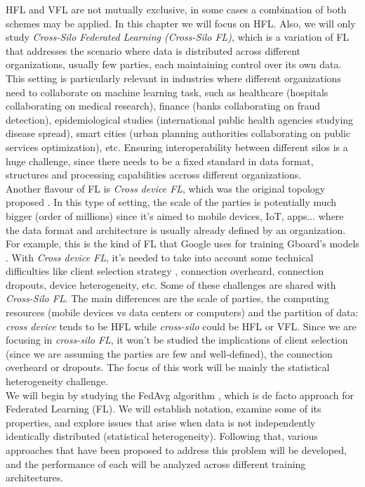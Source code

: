 HFL and VFL are not mutually exclusive, in some cases a combination of both schemes may be applied. In this chapter we will focus on HFL. Also, we will only study \textit{Cross-Silo Federated Learning (Cross-Silo FL)},
which is a variation of FL that addresses the scenario where data is distributed across different organizations, usually few parties, each maintaining control over its own data.
This setting is particularly relevant in industries where different organizations need to collaborate on machine learning task, such as healthcare (hospitals collaborating on medical research), finance (banks collaborating on fraud detection), epidemiological studies (international public health agencies studying disease spread),
smart cities (urban planning authorities collaborating on public services optimization), etc. Ensuring interoperability between different silos is a huge challenge, since there needs to be a fixed standard in data format, structures and processing capabilities accross different organizations.\\
Another flavour of FL is \textit{Cross device FL}, which was the original topology proposed \cite*{mcmahan2023a}. In this type of setting, the scale of the parties is potentially much bigger (order of millions) since it's aimed to mobile devices, IoT, apps... where the data format and architecture is usually already defined by an organization. For example, this is the kind of FL that Google uses for training Gboard's models \cite*{zhang2023}. With \textit{Cross device FL}, it's needed to take into account some technical difficulties like client selection strategy \cite*{smestad2023}, connection overheard, connection dropouts, device heterogeneity, etc.
Some of these challenges are shared with \textit{Cross-Silo FL}. The main differences are the scale of parties, the computing resources (mobile devices vs data centers or computers) and the partition of data: \textit{cross device} tends to be HFL while \textit{cross-silo} could be HFL or VFL. Since we are focusing in \textit{cross-silo FL}, it won't be studied the implications of client selection (since we are assuming the parties are few and well-defined), the connection overheard or dropouts. The focus of this work will be mainly the statistical heterogeneity challenge.\\
We will begin by studying the FedAvg algorithm \cite{mcmahan2023a}, which is de facto approach for Federated Learning (FL). We will establish notation, examine some of its properties, and explore issues that arise when data is not independently identically distributed (statistical heterogeneity). Following that, various approaches that have been proposed to address this problem will be developed, and the performance of each will be analyzed across different training architectures.

